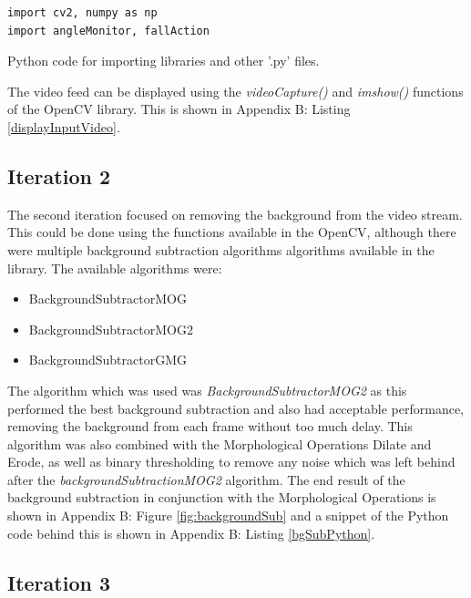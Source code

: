 \documentclass[11pt,a4paper]{report}
\begin{document}
\begin{listing}
\begin{verbatim}
import cv2, numpy as np
import angleMonitor, fallAction
\end{verbatim}
\caption{Python code for importing libraries and other '.py' files.}
\label{PythonImports}
\end{listing}
\noindent
The video feed can be displayed using the \textit{videoCapture()} and \textit{imshow()} functions of the OpenCV library. This is shown in Appendix B: Listing \ref{displayInputVideo}.

\subsection{Iteration 2}

The second iteration focused on removing the background from the video stream. This could be done using the functions available in the OpenCV, although there were multiple background subtraction algorithms algorithms available in the library. The available algorithms were:

\begin{itemize}
  \item BackgroundSubtractorMOG
  \item BackgroundSubtractorMOG2
  \item BackgroundSubtractorGMG
\end{itemize}
\noindent
The algorithm which was used was \textit{BackgroundSubtractorMOG2} as this performed the best background subtraction and also had acceptable performance, removing the background from each frame without too much delay. This algorithm was also combined with the Morphological Operations Dilate and Erode, as well as binary thresholding to remove any noise which was left behind after the \textit{backgroundSubtractionMOG2} algorithm. The end result of the background subtraction in conjunction with the Morphological Operations is shown in Appendix B: Figure \ref{fig:backgroundSub} and a snippet of the Python code behind this is shown in Appendix B: Listing \ref{bgSubPython}.

\subsection{Iteration 3}
\end{document}
